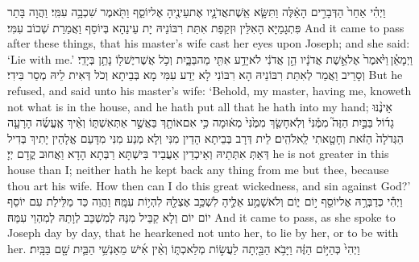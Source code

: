 {וַיְהִ֗י אַחַר֙ הַדְּבָרִ֣ים הָאֵ֔לֶּה וַתִּשָּׂ֧א אֵֽשֶׁת\maqqaf אֲדֹנָ֛יו אֶת\maqqaf עֵינֶ֖יהָ אֶל\maqqaf יוֹסֵ֑ף וַתֹּ֖אמֶר שִׁכְבָ֥ה עִמִּֽי׃}
{וַהֲוָה בָּתַר פִּתְגָמַיָּא הָאִלֵּין וּזְקַפַת אִתַּת רִבּוֹנֵיהּ יָת עֵינַהָא בְּיוֹסֵף וַאֲמַרַת שְׁכוֹב עִמִּי׃}
{And it came to pass after these things, that his master’s wife cast her eyes upon Joseph; and she said: ‘Lie with me.’}{}
{וַיְמָאֵ֓ן \legarmeh  וַיֹּ֙אמֶר֙ אֶל\maqqaf אֵ֣שֶׁת אֲדֹנָ֔יו הֵ֣ן אֲדֹנִ֔י לֹא\maqqaf יָדַ֥ע אִתִּ֖י מַה\maqqaf בַּבָּ֑יִת וְכֹ֥ל אֲשֶׁר\maqqaf יֶשׁ\maqqaf ל֖וֹ נָתַ֥ן בְּיָדִֽי׃}
{וְסָרֵיב וַאֲמַר לְאִתַּת רִבּוֹנֵיהּ הָא רִבּוֹנִי לָא יְדַע עִמִּי מָא בְּבֵיתָא וְכֹל דְּאִית לֵיהּ מְסַר בִּידִי׃}
{But he refused, and said unto his master’s wife: ‘Behold, my master, having me, knoweth not what is in the house, and he hath put all that he hath into my hand;}{}
{אֵינֶ֨נּוּ גָד֜וֹל בַּבַּ֣יִת הַזֶּה֮ מִמֶּ֒נִּי֒ וְלֹֽא\maqqaf חָשַׂ֤ךְ מִמֶּ֙נִּי֙ מְא֔וּמָה כִּ֥י אִם\maqqaf אוֹתָ֖ךְ בַּאֲשֶׁ֣ר אַתְּ\maqqaf אִשְׁתּ֑וֹ וְאֵ֨יךְ אֶֽעֱשֶׂ֜ה הָרָעָ֤ה הַגְּדֹלָה֙ הַזֹּ֔את וְחָטָ֖אתִי לֵֽאלֹהִֽים׃}
{לֵית דְּרָב בְּבֵיתָא הָדֵין מִנִּי וְלָא מְנַע מִנִּי מִדָּעַם אֱלָהֵין יָתִיךְ בְּדִיל דְּאַתְּ אִתְּתֵיהּ וְאֵיכְדֵין אַעֲבֵיד בִּישְׁתָּא רַבְּתָא הָדָא וַאֲחוּב קֳדָם יְיָ׃}
{he is not greater in this house than I; neither hath he kept back any thing from me but thee, because thou art his wife. How then can I do this great wickedness, and sin against God?’}{}
{וַיְהִ֕י כְּדַבְּרָ֥הּ אֶל\maqqaf יוֹסֵ֖ף י֣וֹם \pasek  י֑וֹם וְלֹא\maqqaf שָׁמַ֥ע אֵלֶ֛יהָ לִשְׁכַּ֥ב אֶצְלָ֖הּ לִהְי֥וֹת עִמָּֽהּ׃}
{וַהֲוַה כַּד מַלֵּילַת עִם יוֹסֵף יוֹם יוֹם וְלָא קַבֵּיל מִנַּהּ לְמִשְׁכַּב לְוָתַהּ לְמִהְוֵי עִמַּהּ׃}
{And it came to pass, as she spoke to Joseph day by day, that he hearkened not unto her, to lie by her, or to be with her.}{}
{וַיְהִי֙ כְּהַיּ֣וֹם הַזֶּ֔ה וַיָּבֹ֥א הַבַּ֖יְתָה לַעֲשׂ֣וֹת מְלַאכְתּ֑וֹ וְאֵ֨ין אִ֜ישׁ מֵאַנְשֵׁ֥י הַבַּ֛יִת שָׁ֖ם בַּבָּֽיִת׃}
